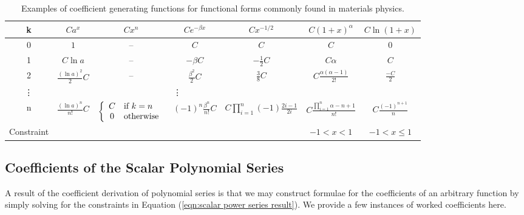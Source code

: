 \begin{sidewaystable}[htp]
\caption{Examples of coefficient generating functions for functional forms commonly found in materials physics.}
\begin{center}
\begin{tabular}{c | c c c c c c}
	k	& %
		$C a^x$	& %
			$C x^n$	& %
				$Ce^{-\beta x}$	& %
					$C x^{-1/2}$ & %
                        $C (1 + x)^\alpha$ & %
                            $C \ln(1 + x)$ \\[2ex]
	\hline
	0	& %
		$1$	& %
			--	& %
				$C$	& %
					$C$ & %
                        $C$ & %
                            $0$ \\[2ex]
	1	& %
		$C \ln a$	& %
			--	& %
				$-\beta C$		& %
					$-\frac{1}{2}C$ & %
                        $C\alpha$ & %
                            $C$ \\[2ex]
	2	& %
		$\frac{(\ln a)^2}{2} C$	& %
			--	&  %
				$\frac{\beta^2}{2} C$	& %
					$\frac{3}{8}C$	& %
                        $C\frac{\alpha (\alpha - 1)}{2!}$ & %
                            $\frac{-C}{2}$ \\[2ex]
	\vdots & \multicolumn{4}{c}{\vdots} \\[2ex]
	n	& %
		$\frac{(\ln a)^n}{n!} C$	& %
			$\left\{\begin{array}{c l}
				C & \text{if}\ k = n \\
				0 & \text{otherwise}
			  \end{array}\right.$	& %
				$(-1)^n\frac{\beta^n}{n!} C$	& %
					$C \prod_{i=1}^n (-1)\frac{2i - 1}{2i}$ & %
                        $C \frac{\prod_{i=1}^n \alpha - n + 1}{n!}$ & %
                            $C\frac{(-1)^{n+1}}{n}$ \\[2ex]
	\hline
    Constraint & %
        & %
            & %
                & %
                    & %
                        $-1 < x < 1$ & %
                            $-1 < x \le 1$ \\
    \hline
\end{tabular}
\end{center}
\label{tab:generating functions of common functions}
\end{sidewaystable}

\subsection{Coefficients of the Scalar Polynomial Series}

A result of the coefficient derivation of polynomial series is that we may construct formulae for the coefficients of an arbitrary function by simply solving for the constraints in Equation (\ref{eqn:scalar power series result}). We provide a few instances of worked coefficients here. 

